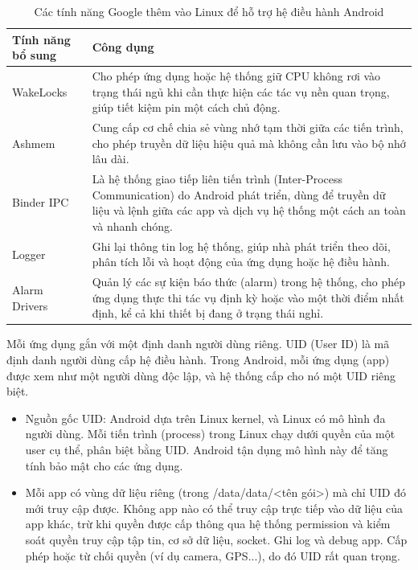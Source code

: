     \begin{table}[H]
        \centering
        \renewcommand{\arraystretch}{1.5}
        \begin{tabular}{|p{3.5cm}|p{12cm}|}
            \hline
            \textbf{Tính năng bổ sung} & \textbf{Công dụng} \\
            \hline
            WakeLocks & Cho phép ứng dụng hoặc hệ thống giữ CPU không rơi vào trạng thái ngủ khi cần thực hiện các tác vụ nền quan trọng, giúp tiết kiệm pin một cách chủ động. \\
            \hline
            Ashmem  & Cung cấp cơ chế chia sẻ vùng nhớ tạm thời giữa các tiến trình, cho phép truyền dữ liệu hiệu quả mà không cần lưu vào bộ nhớ lâu dài. \\
            \hline
            Binder IPC & Là hệ thống giao tiếp liên tiến trình (Inter-Process Communication) do Android phát triển, dùng để truyền dữ liệu và lệnh giữa các app và dịch vụ hệ thống một cách an toàn và nhanh chóng. \\
            \hline
            Logger & Ghi lại thông tin log hệ thống, giúp nhà phát triển theo dõi, phân tích lỗi và hoạt động của ứng dụng hoặc hệ điều hành. \\
            \hline
            Alarm Drivers & Quản lý các sự kiện báo thức (alarm) trong hệ thống, cho phép ứng dụng thực thi tác vụ định kỳ hoặc vào một thời điểm nhất định, kể cả khi thiết bị đang ở trạng thái nghỉ. \\
            \hline
        \end{tabular}
        \caption{Các tính năng Google thêm vào Linux để hỗ trợ hệ điều hành Android}
        \label{table:android-linux-features}
        \end{table}          

\renewcommand{\labelitemi}{--}    
        Mỗi ứng dụng gắn với một định danh người dùng riêng. UID (User ID) là mã định danh người dùng cấp hệ điều hành. Trong Android, mỗi ứng dụng (app) được xem như một người dùng độc lập, và hệ thống cấp cho nó một UID riêng biệt.
        \setlength{\leftmargini}{1.5cm}
        \begin{itemize}
            \item Nguồn gốc UID: Android dựa trên Linux kernel, và Linux có mô hình đa người dùng. Mỗi tiến trình (process) trong Linux chạy dưới quyền của một user cụ thể, phân biệt bằng UID. Android tận dụng mô hình này để tăng tính bảo mật cho các ứng dụng.
            \item Mỗi app có vùng dữ liệu riêng (trong /data/data/<tên gói>) mà chỉ UID đó mới truy cập được. Không app nào có thể truy cập trực tiếp vào dữ liệu của app khác, trừ khi quyền được cấp thông qua hệ thống permission và kiểm soát quyền truy cập tập tin, cơ sở dữ liệu, socket. Ghi log và debug app. Cấp phép hoặc từ chối quyền (ví dụ camera, GPS...), do đó UID rất quan trọng.
        \end{itemize}

